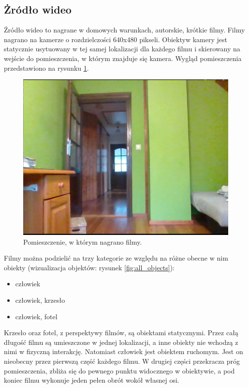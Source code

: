 \subsection{Żródło wideo}
\label{sec:zrodlo_wideo}
Źródło wideo to nagrane w domowych warunkach, autorskie, krótkie filmy. Filmy nagrano na kamerze o rozdzielczości 640x480 pikseli. Obiektyw kamery jest statycznie usytuowany w tej samej lokalizacji dla każdego filmu i skierowany na wejście do pomieszczenia, w którym znajduje się kamera. Wygląd pomieszczenia przedstawiono na rysunku \ref{fig:test-dokladnosc-scena}.

\begin{figure}[H]
    \centering
    \includegraphics[width=\linewidth]{r_test_dokładności/vid_pics/1_1.jpg}
    \caption{Pomieszczenie, w którym nagrano filmy.}
    \label{fig:test-dokladnosc-scena}
\end{figure}


Filmy można podzielić na trzy kategorie ze względu na różne obecne w nim obiekty (wizualizacja objektów: rysunek \ref{fig:all_objects}):
\begin{itemize}
    \item człowiek
    \item człowiek, krzesło
    \item człowiek, fotel
\end{itemize}
Krzesło oraz fotel, z perspektywy filmów, są obiektami statycznymi. Przez całą długość filmu są umieszczone w jednej lokalizacji, a inne obiekty nie wchodzą z nimi w fizyczną interakcję.
Natomiast człowiek jest obiektem ruchomym. Jest on nieobecny przez pierwszą część każdego filmu. W drugiej części przekracza próg pomieszczenia, zbliża się do pewnego punktu widocznego w obiektywie, a pod koniec filmu wykonuje jeden pełen obrót wokół własnej osi. 

